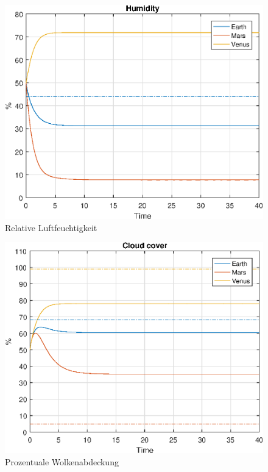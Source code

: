 \begin{refsection}
		\begin{figure}
			\center
			\includegraphics[height=0.45\textheight]{planeten/Matlab/figures/humidity.eps}
			\caption{Relative Luftfeuchtigkeit}
		\end{figure}
		
		\begin{figure}
			\center
			\includegraphics[height=0.45\textheight]{planeten/Matlab/figures/cloudCover.eps}
			\caption{Prozentuale Wolkenabdeckung}
		\end{figure}
		

\end{refsection}
